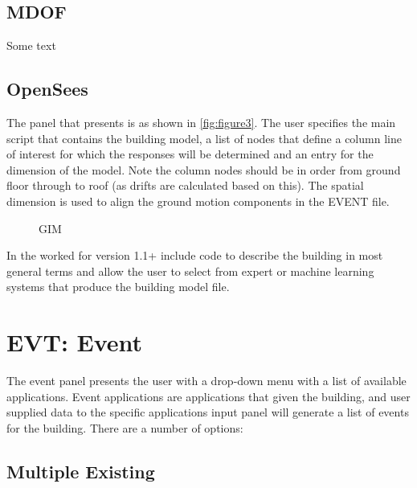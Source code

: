 \subsection{MDOF}

Some text

\subsection{OpenSees}
The panel that presents is as shown in \autoref{fig:figure3}. 
The user specifies the main script that contains the building model, 
a list of nodes that define a column line of interest for which the responses will be determined and an entry for the dimension of the model. 
Note the column nodes should be in order from ground floor through to roof (as drifts are calculated based on this). 
The spatial dimension is used to align the ground motion components in the EVENT file.

\begin{figure}[!htbp]
  \caption{GIM}
  \label{fig:figure3}
\end{figure}

In the worked for version 1.1+ include code to describe the building
in most general terms and allow the user to select from expert or
machine learning systems that produce the building model file.


\section{EVT: Event}
The event panel presents the user with a drop-down menu with a list of
available applications.  Event applications are applications that
given the building, and user supplied data to the specific
applications input panel will generate a list of events for the
building. There are a number of options:

\subsection{Multiple Existing}

